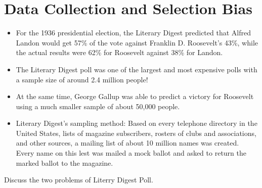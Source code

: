 \hypertarget{ch:data}{%
\chapter{Data Collection and Selection Bias}\label{ch:data}}

\begin{example}
  \begin{itemize}
  \item For the 1936 presidential election, the Literary Digest predicted that Alfred Landon would get 57\% of the vote against Franklin D. Roosevelt's 43\%, while the actual results were 62\% for Roosevelt against 38\% for Landon.
  \item The Literary Digest poll was one of the largest and most expensive polls with a sample size of around 2.4 million people!
  \item At the same time, George Gallup was able to predict a victory for Roosevelt using a much smaller sample of about 50,000 people.
  \item Literary Digest's sampling method: Based on every telephone directory in the United States, lists of magazine subscribers, rosters of clubs and associations, and other sources, a mailing list of about 10 million names was created. Every name on this lest was mailed a mock ballot and asked to return the marked ballot to the magazine.
  \end{itemize}
  {
    \color{red} Discuss the two problems of Literry Digest Poll. 
  }

\end{example}

